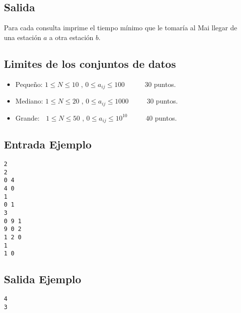 \subsection*{Salida}
Para cada consulta imprime el tiempo mínimo que le tomaría al Mai llegar de una estación $a$ a otra estación $b$.

\subsection*{Limites de los conjuntos de datos}
\begin{itemize}
    \item Pequeño: $ 1\leq N \leq 10 $ , $ 0\leq a_{ij} \leq 100 $ $\quad \quad \;$ $30$ puntos.
    \item Mediano: $ 1\leq N\leq 20 $ , $ 0\leq a_{ij} \leq 1000 $ $\quad \quad$ $30$ puntos.
    \item Grande: $ \,\;\, 1\leq N\leq 50 $ , $ 0\leq a_{ij} \leq 10^{10} $ $\quad \quad$ $40$ puntos.
\end{itemize}

\begin{multicols}{2}
\subsection*{Entrada Ejemplo}
\begin{verbatim}
2
2
0 4
4 0
1
0 1
3
0 9 1
9 0 2
1 2 0
1
1 0
\end{verbatim}
\columnbreak
\subsection*{Salida Ejemplo}
\begin{verbatim}
4
3
\end{verbatim}
\end{multicols}

